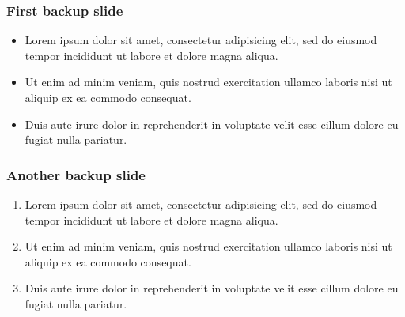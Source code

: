 \documentclass[11pt,xcolor={dvipsnames},hyperref={pdftex,pdfpagemode=UseNone,hidelinks,pdfdisplaydoctitle=true},usepdftitle=false]{beamer}
\begin{document}
\begin{frame}[label=backupSlide]
\frametitle{First backup slide}
\begin{itemize}
\item Lorem ipsum dolor sit amet, consectetur adipisicing elit, sed do eiusmod
tempor incididunt ut labore et dolore magna aliqua.
\item  Ut enim ad minim veniam, quis nostrud exercitation ullamco laboris nisi ut aliquip ex ea commodo consequat. 
\item Duis aute irure dolor in reprehenderit in voluptate velit esse
cillum dolore eu fugiat nulla pariatur. 
\end{itemize}
\hyperlink{firstSlide}{}
\end{frame}

\begin{frame}[label=anotherBackupSlide]
\frametitle{Another backup slide}
\begin{enumerate}
\item Lorem ipsum dolor sit amet, consectetur adipisicing elit, sed do eiusmod
tempor incididunt ut labore et dolore magna aliqua.
\item  Ut enim ad minim veniam, quis nostrud exercitation ullamco laboris nisi ut aliquip ex ea commodo consequat. 
\item Duis aute irure dolor in reprehenderit in voluptate velit esse
cillum dolore eu fugiat nulla pariatur. 
\end{enumerate}
\hyperlink{firstSlide}{}
\end{frame}
\end{document}
